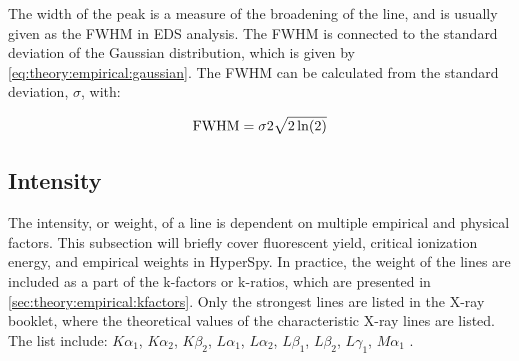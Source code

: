 The width of the peak is a measure of the broadening of the line, and is usually given as the FWHM in EDS analysis. The FWHM is connected to the standard deviation of the Gaussian distribution, which is given by \cref{eq:theory:empirical:gaussian}.
The FWHM can be calculated from the standard deviation, $\sigma$, with:

\begin{equation}
    \label{eq:theory:empirical:peaks:FWHM}
    \textnormal{FWHM} = {\sigma}{2\sqrt{2\ln(2)}}
\end{equation}


%
% 
\subsection{Intensity}
\label{sec:theory:empirical:intensity}



The intensity, or weight, of a line is dependent on multiple empirical and physical factors.
This subsection will briefly cover fluorescent yield, critical ionization energy, and empirical weights in HyperSpy.
In practice, the weight of the lines are included as a part of the k-factors or k-ratios, which are presented in \cref{sec:theory:empirical:kfactors}.
Only the strongest lines are listed in the X-ray booklet, where the theoretical values of the characteristic X-ray lines are listed.
The list include: $K\alpha_1$, $K\alpha_2$, $K\beta_2$, $L\alpha_1$, $L\alpha_2$, $L\beta_1$, $L\beta_2$, $L\gamma_1$, $M\alpha_1$ \cite{thompson_x-ray_2004}.
















